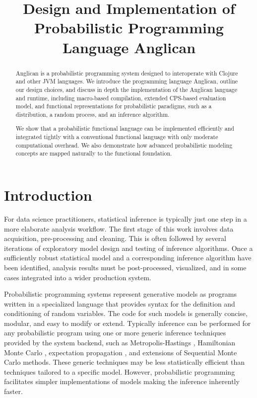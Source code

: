 \documentclass[preprint]{sigplanconf}
\title{Design and Implementation of Probabilistic Programming Language Anglican}
\begin{document}
\maketitle

\begin{abstract}
    Anglican is a probabilistic programming system designed to interoperate
    with Clojure and other JVM languages. We introduce the
    programming language Anglican, outline our design choices,
    and discuss in depth the implementation of the Anglican language
    and runtime, including macro-based compilation, extended
    CPS-based evaluation model, and functional representations for
    probabilistic paradigms, such as a distribution,
    a random process, and an inference algorithm.

    We show that a probabilistic functional language can be
    implemented efficiently and integrated tightly with a
    conventional functional language with only moderate
    computational overhead. We also demonstrate how advanced
    probabilistic modeling concepts are mapped naturally
    to the functional foundation.
\end{abstract}

\section{Introduction}
\label{sec:intro}

For data science practitioners, statistical inference is typically
just one step in a more elaborate analysis workflow. The first stage
of this work involves data acquisition, pre-processing and cleaning.
This is often followed by several iterations of exploratory model
design and testing of inference algorithms. Once a sufficiently
robust statistical model and a corresponding inference algorithm have
been identified, analysis results must be post-processed, visualized,
and in some cases integrated into a wider production system.

Probabilistic programming systems \cite{GMR+08,MSP14,WVM14,GS15}
represent generative models as programs written in a specialized
language that provides syntax for the definition and conditioning of
random variables. The code for such models is generally concise,
modular, and easy to modify or extend. Typically inference can be
performed for any probabilistic program using one or more generic
inference techniques provided by the system backend, such as
Metropolis-Hastings \cite{WSG11,MSP14,YHG14}, Hamiltonian Monte Carlo
\cite{SDT04}, expectation propagation \cite{MWG+10}, and extensions
of Sequential Monte Carlo \cite{WVM14,MYM+15,PWD+14} methods.
These generic techniques may be less statistically efficient
than techniques tailored to a specific model. However,
probabilistic programming facilitates simpler implementations of
models making the inference inherently faster.
\end{document}
